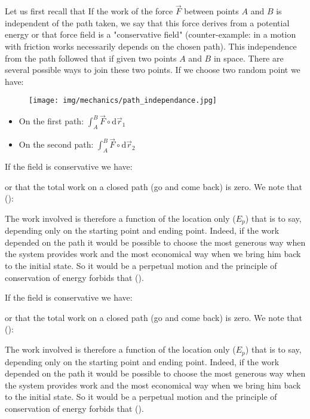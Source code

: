 	Let us first recall that If the work of the force $\vec{F}$ between points $A$ and $B$ is independent of the path taken, we say that this force derives from a potential energy or that force field is a "conservative field" (counter-example: in a motion with friction works necessarily depends on the chosen path). This independence from the path followed that if given two points $A$ and $B$ in space. There are several possible ways to join these two points. If we choose two random point we have:
	\begin{figure}[H]
		\centering
		\texttt{[image: img/mechanics/path\_independance.jpg]}
	\end{figure} 
	\begin{itemize}
		\item On the first path: $\int_A^B \vec{F}\circ\mathrm{d}\vec{r}_1$

		\item On the second path: $\int_A^B \vec{F}\circ\mathrm{d}\vec{r}_2$
	\end{itemize}
	If the field is conservative we have:
	
	or that the total work on a closed path (go and come back) is zero. We note that ():
	
	The work involved is therefore a function of the location only ($E_p$) that is to say, depending only on the starting point and ending point. Indeed, if the work depended on the path it would be possible to choose the most generous way when the system provides work and the most economical way when we bring him back to the initial state. So it would be a perpetual motion and the principle of conservation of energy forbids that ().
	
	If the field is conservative we have:
	
	or that the total work on a closed path (go and come back) is zero. We note that ():
	
	The work involved is therefore a function of the location only ($E_p$) that is to say, depending only on the starting point and ending point. Indeed, if the work depended on the path it would be possible to choose the most generous way when the system provides work and the most economical way when we bring him back to the initial state. So it would be a perpetual motion and the principle of conservation of energy forbids that ().
	
